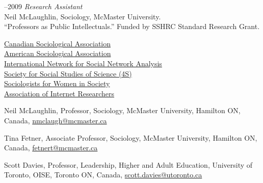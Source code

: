 \documentclass[9pt,usenames,dvipsnames]{article}
\begin{document}
–2009 {\it Research Assistant}\\
Neil McLaughlin, Sociology, McMaster University.\\ 
``Professors as Public Intellectuals.'' Funded by SSHRC Standard Research Grant.\\





\noindent \href{http://www.csa-scs.ca}{Canadian Sociological Association} \\
\href{http://www.asanet.org}{American Sociological Association} \\
\href{http://www.insna.org}{International Network for Social Network Analysis} \\
\href{http://4sonline.org}{Society for Social Studies of Science (4S)} \\
\href{http://www.socwomen.org}{Sociologists for Women in Society} \\
\href{http://aoir.org}{Association of Internet Researchers} \\


\ind Neil McLaughlin, Professor, Sociology, McMaster University, Hamilton ON, Canada, \href{mailto:nmclaugh@mcmaster.ca}{nmclaugh@mcmaster.ca}

\ind Tina Fetner, Associate Professor, Sociology, McMaster University, Hamilton ON, Canada, \href{mailto:fetnert@mcmaster.ca}{fetnert@mcmaster.ca}

\ind Scott Davies, Professor, Leadership, Higher and Adult Education, University of Toronto, OISE, Toronto ON, Canada, \href{mailto:scott.davies@utoronto.ca}{scott.davies@utoronto.ca}
\end{document}
